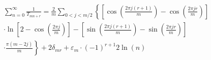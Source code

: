 \documentclass{article} %
\begin{document}
\begin{multline*}
			\sum_{n=0}^\infty \frac{1}{T_{mn+r}} = 
			\frac{2}{m} \sum\limits_{0<j<m/2} \left\{ 
			\left[
				\cos \left(\frac{2 \pi j (r+1)}{m} \right) - \cos \left( \frac{2 \pi j r}{m} \right)
			\right] \right. \\
			\left. \cdot \ln \left[ 
			2 - \cos \left( \frac{2 \pi j}{m} \right)
			\right]
			- \left[ \sin \left(\frac{2 \pi j (r+1)}{m} \right) - \sin \left( \frac{2 \pi j r}{m} \right) \right] \right. \\
			\left. \cdot \frac{\pi (m - 2j)}{m}
			\right\} + 2 \delta_{mr} + \varepsilon_m \cdot (-1)^{r+1} 2 \ln(n)
\end{multline*}
\end{document}
